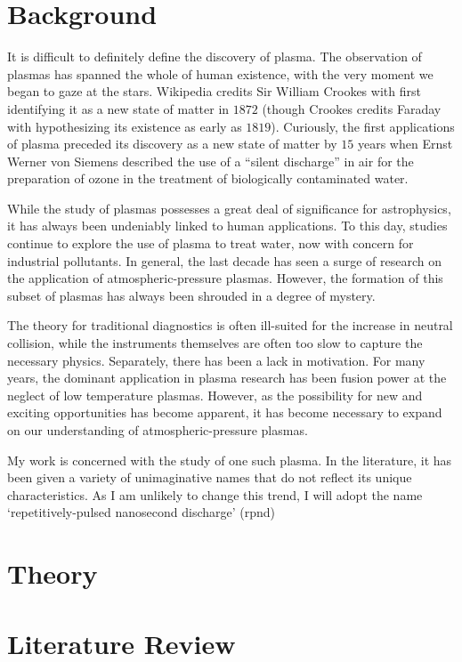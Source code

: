 \section{Background}
It is difficult to definitely define the discovery of plasma. The observation of
plasmas has spanned the whole of human existence, with the very moment we began
to gaze at the stars. Wikipedia credits Sir William Crookes with first
identifying it as a new state of matter in $1872$ (though Crookes credits
Faraday with hypothesizing its existence as early as $1819$). Curiously, the
first applications of plasma preceded its discovery as a new state of matter by
$15$ years when Ernst Werner von Siemens described the use of a ``silent
discharge'' in air for the preparation of ozone in the treatment of biologically
contaminated water.

While the study of plasmas possesses a great deal of significance for
astrophysics, it has always been undeniably linked to human applications.  To
this day, studies continue to explore the use of plasma to treat water, now with
concern for industrial pollutants. In general, the last decade has seen a surge
of research on the application of atmospheric-pressure plasmas. However, the
formation of this subset of plasmas has always been shrouded in a degree of
mystery.

The theory for traditional diagnostics is often ill-suited for the increase in
neutral collision, while the instruments themselves are often too slow to
capture the necessary physics. Separately, there has been a lack in motivation.
For many years, the dominant application in plasma research has been fusion
power at the neglect of low temperature plasmas. However, as the possibility for
new and exciting opportunities has become apparent, it has become necessary to
expand on our understanding of atmospheric-pressure plasmas.

My work is concerned with the study of one such plasma. In the literature, it
has been given a variety of unimaginative names that do not reflect its unique
characteristics. As I am unlikely to change this trend, I will adopt the name
`repetitively-pulsed nanosecond discharge' (\ac{rpnd})

\section{Theory}

\section{Literature Review}
